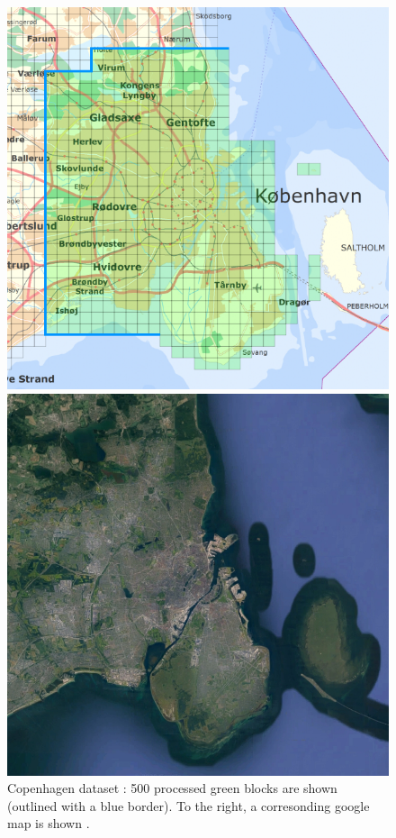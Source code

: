 \documentclass[10pt,letterpaper]{article}
\begin{document}
\begin{figure}[H]
    \centering
    \capstart
    \begin{minipage}[b]{0.45\linewidth}
        \includegraphics[width=\textwidth]{images/copenhagen/figures/tiles.png}
    \end{minipage}
    \begin{minipage}[b]{0.45\linewidth}
        \includegraphics[width=\textwidth]{images/copenhagen/figures/tiles_gmap.jpg}
    \end{minipage}
    \caption{Copenhagen dataset \cite{skraafoto_copenhagen}: 500 processed green blocks are shown (outlined with a blue border). To the right, a corresonding google map is shown \cite{gmaps_copenhagen}.}
    \label{fig:copenhagen_tiles}
\end{figure}
\end{document}
